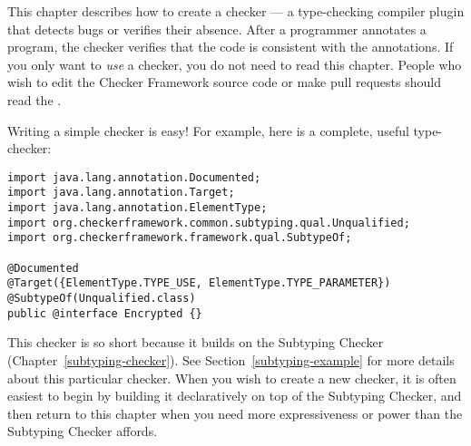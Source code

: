 \htmlhr
{}
\label{writing-a-checker} %

\newcommand{\TreeAPIBase}{https://docs.oracle.com/en/java/javase/17/docs/api/jdk.compiler/com/sun/source}
\newcommand{\refTreeclass}[2]{\href{\TreeAPIBase{}/#1/#2.html?is-external=true}{\<#2>}}
\newcommand{\ModelAPIBase}{https://docs.oracle.com/en/java/javase/17/docs/api/java.compiler/javax/lang/model}
\newcommand{\refModelclass}[2]{\href{\ModelAPIBase{}/#1/#2.html?is-external=true}{\<#2>}}

This chapter describes how to create a checker
--- a type-checking compiler plugin that detects bugs or verifies their
absence.  After a programmer annotates a program,
the checker verifies that the code is consistent
with the annotations.
If you only want to \emph{use} a checker, you do not need to read this
chapter.
People who wish to edit the Checker Framework source code or
make pull requests should read the
.


Writing a simple checker is easy!  For example, here is a complete, useful
type-checker:

\begin{Verbatim}
import java.lang.annotation.Documented;
import java.lang.annotation.Target;
import java.lang.annotation.ElementType;
import org.checkerframework.common.subtyping.qual.Unqualified;
import org.checkerframework.framework.qual.SubtypeOf;

@Documented
@Target({ElementType.TYPE_USE, ElementType.TYPE_PARAMETER})
@SubtypeOf(Unqualified.class)
public @interface Encrypted {}
\end{Verbatim}

This checker is so short because it builds on the Subtyping Checker
(Chapter~\ref{subtyping-checker}).
See Section~\ref{subtyping-example} for more details about this particular checker.
When you wish to create a new checker, it is often easiest to begin by
building it declaratively on top of the Subtyping Checker, and then return to
this chapter when you need more expressiveness or power than the Subtyping
Checker affords.

